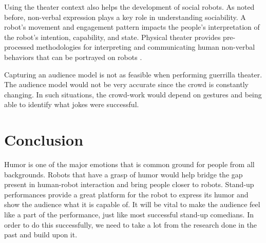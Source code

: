 \documentclass[onecolumn, draftclsnofoot,10pt, compsoc]{IEEEtran}
\begin{document}
Using the theater context also helps the development of social robots. As noted before, non-verbal expression plays a key role in understanding sociability. A robot's movement and engagement pattern impacts the people's interpretation of the robot's intention, capability, and state. Physical theater provides pre-processed methodologies for interpreting and communicating human non-verbal behaviors that can be portrayed on robots \cite{KnightEightLessons:2011}.

Capturing an audience model is not as feasible when performing guerrilla theater. The audience model would not be very accurate since the crowd is constantly changing. In such situations, the crowd-work would depend on gestures and being able to identify what jokes were successful. 

\section{Conclusion}

Humor is one of the major emotions that is common ground for people from all backgrounds. Robots that have a grasp of humor would help bridge the gap present in human-robot interaction and bring people closer to robots. Stand-up performances provide a great platform for the robot to express its humor and show the audience what it is capable of. It will be vital to make the audience feel like a part of the performance, just like most successful stand-up comedians. In order to do this successfully, we need to take a lot from the research done in the past and build upon it.



\pagebreak




\end{document}
